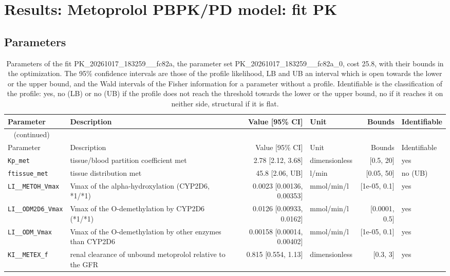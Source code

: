\documentclass{article}
\begin{document}
\section{Results: Metoprolol PBPK/PD model: fit PK}

\subsection{Parameters}

\begin{longtable}{llrlrl}
\caption{Parameters of the fit PK\_20261017\_183259\_\_fc82a, the parameter set PK\_20261017\_183259\_\_fc82a\_0, cost 25.8, with their bounds in the optimization. The 95\% confidence intervals are those of the profile likelihood, LB and UB an interval which is open towards the lower or the upper bound, and the Wald intervals of the Fisher information for a parameter without a profile. Identifiable is the classification of the profile: yes, no (LB) or no (UB) if the profile does not reach the threshold towards the lower or the upper bound, no if it reaches it on neither side, structural if it is flat.}\label{tab:parameters:PK_20261017_183259__fc82a} \\
\toprule
Parameter & Description & Value [95\% CI] & Unit & Bounds & Identifiable \\
\midrule
\endfirsthead
\multicolumn{6}{l}{\small\tablename~\thetable{} (continued)} \\
\toprule
Parameter & Description & Value [95\% CI] & Unit & Bounds & Identifiable \\
\midrule
\endhead
\bottomrule
\endlastfoot
\texttt{Kp\_met} & tissue/blood partition coefficient met & 2.78 [2.12, 3.68] & dimensionless & [0.5, 20] & yes \\
\texttt{ftissue\_met} & tissue distribution met & 45.8 [2.06, UB] & l/min & [0.05, 50] & no (UB) \\
\texttt{LI\_\_METOH\_Vmax} & Vmax of the alpha-hydroxylation (CYP2D6, *1/*1) & 0.0023 [0.00136, 0.00353] & mmol/min/l & [1e-05, 0.1] & yes \\
\texttt{LI\_\_ODM2D6\_Vmax} & Vmax of the O-demethylation by CYP2D6 (*1/*1) & 0.0126 [0.00933, 0.0162] & mmol/min/l & [0.0001, 0.5] & yes \\
\texttt{LI\_\_ODM\_Vmax} & Vmax of the O-demethylation by other enzymes than CYP2D6 & 0.00158 [0.00014, 0.00402] & mmol/min/l & [1e-05, 0.1] & yes \\
\texttt{KI\_\_METEX\_f} & renal clearance of unbound metoprolol relative to the GFR & 0.815 [0.554, 1.13] & dimensionless & [0.3, 3] & yes \\

\end{longtable}
\end{document}
